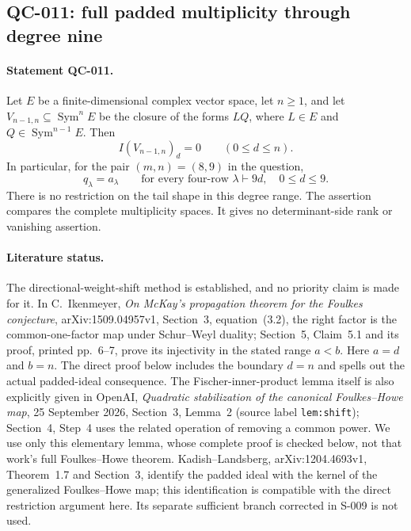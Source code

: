\subsection{QC-011: full padded multiplicity through degree nine}

\paragraph{Statement QC-011.}
Let $E$ be a finite-dimensional complex vector space, let $n\geq1$,
and let $V_{n-1,n}\subseteq\operatorname{Sym}^nE$ be the closure of
the forms $LQ$, where $L\in E$ and $Q\in\operatorname{Sym}^{n-1}E$.
Then
\[
       I(V_{n-1,n})_d=0\qquad(0\leq d\leq n).
       \tag{QC-011.1}
\]
In particular, for the pair $(m,n)=(8,9)$ in the question,
\[
       q_\lambda=a_\lambda\qquad
       \text{for every four-row }\lambda\vdash9d,
       \quad 0\leq d\leq9.
       \tag{QC-011.2}
\]
There is no restriction on the tail shape in this degree range.
The assertion compares the complete multiplicity spaces.
It gives no determinant-side rank or vanishing assertion.

\paragraph{Literature status.}
The directional-weight-shift method is established, and no priority
claim is made for it.  In C.~Ikenmeyer, \emph{On McKay's propagation
theorem for the Foulkes conjecture}, arXiv:1509.04957v1, Section~3,
equation~(3.2), the right factor is the common-one-factor map under
Schur--Weyl duality; Section~5, Claim~5.1 and its proof, printed
pp.~6--7, prove its injectivity in the stated range $a<b$.
Here $a=d$ and $b=n$.  The direct proof below includes the boundary
$d=n$ and spells out the actual padded-ideal consequence.
The Fischer-inner-product lemma itself is also explicitly given in
OpenAI, \emph{Quadratic stabilization of the canonical Foulkes--Howe
map}, 25 September 2026, Section~3, Lemma~2
(source label \texttt{lem:shift}); Section~4, Step~4 uses the related
operation of removing a common power.  We use only this elementary
lemma, whose complete proof is checked below, not that work's
full Foulkes--Howe theorem.
Kadish--Landsberg, arXiv:1204.4693v1, Theorem~1.7 and Section~3,
identify the padded ideal with the kernel of the generalized
Foulkes--Howe map; this identification is compatible with the direct
restriction argument here.  Its separate sufficient branch corrected
in S-009 is not used.

